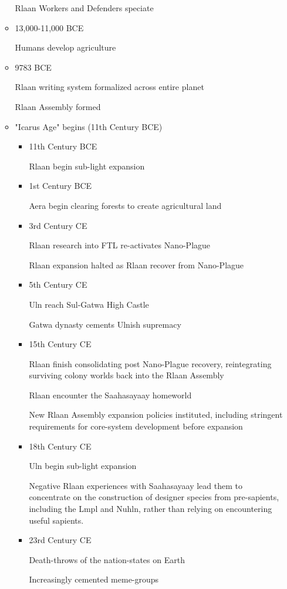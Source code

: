 \begin{itemize}
\begin{itemize}
Rlaan Workers and Defenders speciate 
\item	 13,000-11,000 BCE 

Humans develop agriculture 
\item	9783 BCE 

Rlaan writing system formalized across entire planet 

Rlaan Assembly formed 

\item "Icarus Age" begins (11th Century BCE)
\begin{itemize}
\item	11th Century BCE 

Rlaan begin sub-light expansion 
\item	1st Century BCE 

Aera begin clearing forests to create agricultural land 
\item	3rd Century CE 

Rlaan research into FTL re-activates Nano-Plague 

Rlaan expansion halted as Rlaan recover from Nano-Plague 

\item	5th Century CE 

Uln reach Sul-Gatwa High Castle 

Gatwa dynasty cements Ulnish supremacy 

\item	15th Century CE 

Rlaan finish consolidating post Nano-Plague recovery, reintegrating
surviving colony worlds back into the Rlaan Assembly

Rlaan encounter the Saahasayaay homeworld 

New Rlaan Assembly expansion policies instituted, including stringent requirements for core-system development before expansion 

\item	18th Century CE 

Uln begin sub-light expansion 

Negative Rlaan experiences with Saahasayaay lead them to concentrate
on the construction of designer species from pre-sapients, including
the Lmpl and Nuhln, rather than relying on encountering useful
sapients.

\item	23rd Century CE 

Death-throws of the nation-states on Earth 

Increasingly cemented meme-groups 


\end{itemize}
\end{itemize}
\end{itemize}
